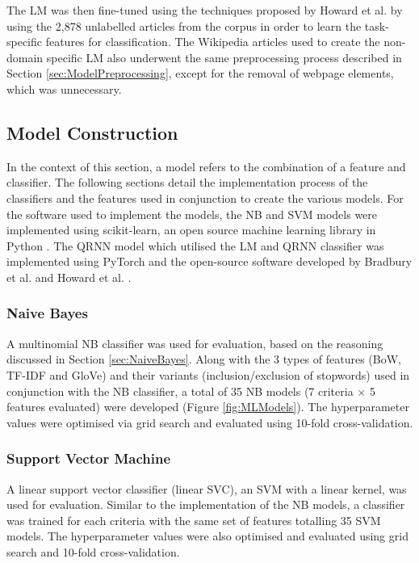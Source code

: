 \documentclass[a4paper,twoside,phd]{BYUPhys}
\begin{document}
The LM was then fine-tuned using the techniques proposed by Howard et al. \cite{Howard2018} by using the 2,878 unlabelled articles from the corpus in order to learn the task-specific features for classification. The Wikipedia articles used to create the non-domain specific LM also underwent the same preprocessing process described in Section \ref{sec:ModelPreprocessing}, except for the removal of webpage elements, which was unnecessary.

\subsection{Model Construction}
\label{sec:ModelSelection}

In the context of this section, a model refers to the combination of a feature and classifier. The following sections detail the implementation process of the classifiers and the features used in conjunction to create the various models.
For the software used to implement the models, the NB and SVM models were implemented using scikit-learn, an open source machine learning library in Python \cite{scikit-learn}. The QRNN model which utilised the LM and QRNN classifier was implemented using PyTorch \cite{paszke2017automatic} and the open-source software developed by Bradbury et al. \cite{bradbury2016quasi} and Howard et al. \cite{Howard2018}. 

\subsubsection{Naive Bayes}
\label{sec:ModelNB}

A multinomial NB classifier was used for evaluation, based on the reasoning discussed in Section \ref{sec:NaiveBayes}. Along with the 3 types of features (BoW, TF-IDF and GloVe) and their variants (inclusion/exclusion of stopwords) used in conjunction with the NB classifier, a total of 35 NB models (7 criteria $\times$ 5 features evaluated) were developed (Figure \ref{fig:MLModels}). The hyperparameter values were optimised via grid search and evaluated using 10-fold cross-validation. 

\subsubsection{Support Vector Machine}
\label{sec:ModelSVM}

A linear support vector classifier (linear SVC), an SVM with a linear kernel, was used for evaluation. Similar to the implementation of the NB models, a classifier was trained for each criteria with the same set of features totalling 35 SVM models. The hyperparameter values were also optimised and evaluated using grid search and 10-fold cross-validation.
\end{document}

